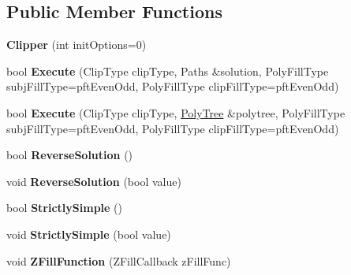 \subsection*{Public Member Functions}
\begin{DoxyCompactItemize}
\item 
\mbox{\label{class_clipper_lib_1_1_clipper_adceb8536f6a80e8f115213dba9208427}} 
{\bfseries Clipper} (int init\+Options=0)
\item 
\mbox{\label{class_clipper_lib_1_1_clipper_a06da196a4b4151edd2e5426ed48744cf}} 
bool {\bfseries Execute} (Clip\+Type clip\+Type, Paths \&solution, Poly\+Fill\+Type subj\+Fill\+Type=pft\+Even\+Odd, Poly\+Fill\+Type clip\+Fill\+Type=pft\+Even\+Odd)
\item 
\mbox{\label{class_clipper_lib_1_1_clipper_aceb19a1e5a5c9e31067f4d1177793403}} 
bool {\bfseries Execute} (Clip\+Type clip\+Type, \mbox{\hyperlink{class_clipper_lib_1_1_poly_tree}{Poly\+Tree}} \&polytree, Poly\+Fill\+Type subj\+Fill\+Type=pft\+Even\+Odd, Poly\+Fill\+Type clip\+Fill\+Type=pft\+Even\+Odd)
\item 
\mbox{\label{class_clipper_lib_1_1_clipper_ad556ba9961f498de02d55dc95bc5a889}} 
bool {\bfseries Reverse\+Solution} ()
\item 
\mbox{\label{class_clipper_lib_1_1_clipper_a44afc0c82a1d2607829b5fd21f7644ef}} 
void {\bfseries Reverse\+Solution} (bool value)
\item 
\mbox{\label{class_clipper_lib_1_1_clipper_a50eb4c514466ed37fd365769e0bcf67b}} 
bool {\bfseries Strictly\+Simple} ()
\item 
\mbox{\label{class_clipper_lib_1_1_clipper_a85aa82d75e0d7d1f380d2e96231d6aa3}} 
void {\bfseries Strictly\+Simple} (bool value)
\item 
\mbox{\label{class_clipper_lib_1_1_clipper_a6c09c403358ae8c4a190c2c3529aa01c}} 
void {\bfseries Z\+Fill\+Function} (Z\+Fill\+Callback z\+Fill\+Func)
\end{DoxyCompactItemize}
